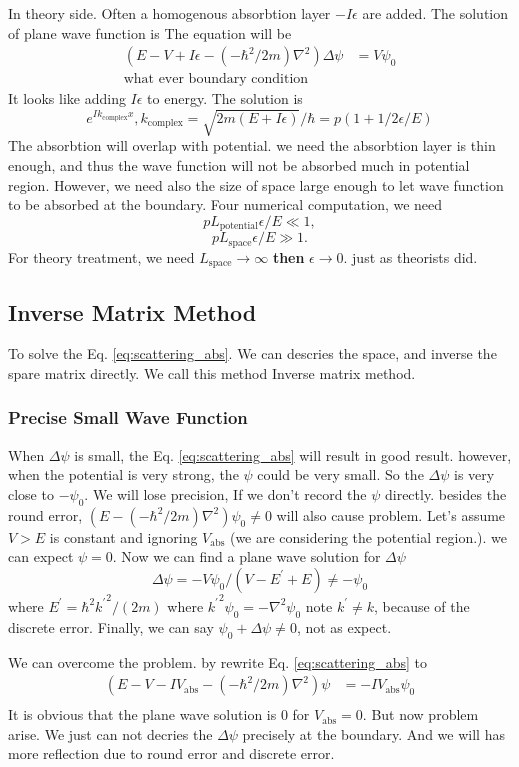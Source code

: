 \documentclass[12pt,twoside]{article}
\begin{document}
In theory side. Often a homogenous absorbtion layer $-I\epsilon$ are added. The solution of plane wave function is
The equation will be
\begin{align}
(E - V + I\epsilon -(-\hbar^2/2m)\nabla^2)\Delta\psi &= V\psi_0\\
\text{what ever boundary condition}
\end{align}
It looks like adding $I\epsilon$ to energy. The solution is
$$
e^{I k_\text{complex} x}, k_\text{complex} = \sqrt{2m(E+I\epsilon)}/\hbar =  p(1+1/2\epsilon/E)
$$
The absorbtion will overlap with potential. we need the absorbtion layer is thin enough, and thus the wave function will not be absorbed much in potential region. However, we need also the size of space large enough to let wave function to be absorbed at the boundary.
Four numerical computation, we need $$pL_\text{potential} \epsilon/E \ll 1,$$ $$ p L_\text{space}\epsilon/E \gg 1.$$
For theory treatment, we need $L_\text{space}\rightarrow \infty$ \textbf{then} $\epsilon \rightarrow 0$. just as theorists did.

\subsection{Inverse Matrix Method}
To solve the Eq. \ref{eq:scattering_abs}. We can descries the space, and inverse the spare matrix directly. We call this method Inverse matrix method.


\subsubsection{Precise Small Wave Function}
When $\Delta \psi$ is small, the Eq. \ref{eq:scattering_abs} will result in good result. however, when the potential is very strong, the $\psi$ could be very small. So the $\Delta \psi$ is very close to $-\psi_0$. We will lose precision, If we don't record the $\psi$ directly. besides the round error, $(E-(-\hbar^2/2m)\nabla^2)\psi_0 \neq 0$ will also cause problem. Let's assume $V > E$ is constant and ignoring $V_\text{abs}$ (we are considering the potential region.). we can expect $\psi=0$. Now we can find a plane wave solution for $\Delta\psi$
$$
\Delta\psi = -V\psi_0/(V-E^\prime+E) \neq -\psi_0
$$
where $E^\prime =\hbar^2 {k^\prime}^2 / (2m)$
where ${k^\prime}^2 \psi_0 = -\nabla^2\psi_0$
note $k^\prime\neq k$, because of the discrete error. Finally, we can say $\psi_0+\Delta\psi\neq 0$, not as expect.

We can overcome the problem. by rewrite Eq. \ref{eq:scattering_abs} to
\begin{align}\label{eq:scattering_abs_psi}
(E - V - IV_\text{abs} -(-\hbar^2/2m)\nabla^2)\psi &= -IV_\text{abs}\psi_0\\ \label{eq:scattering_boundary_abs}
\end{align}
It is obvious that the plane wave solution is $0$ for $V_\text{abs} = 0$. But now problem arise. We just can not decries the $\Delta\psi$ precisely at the boundary. And we will has more reflection due to round error and discrete error.
\end{document}
